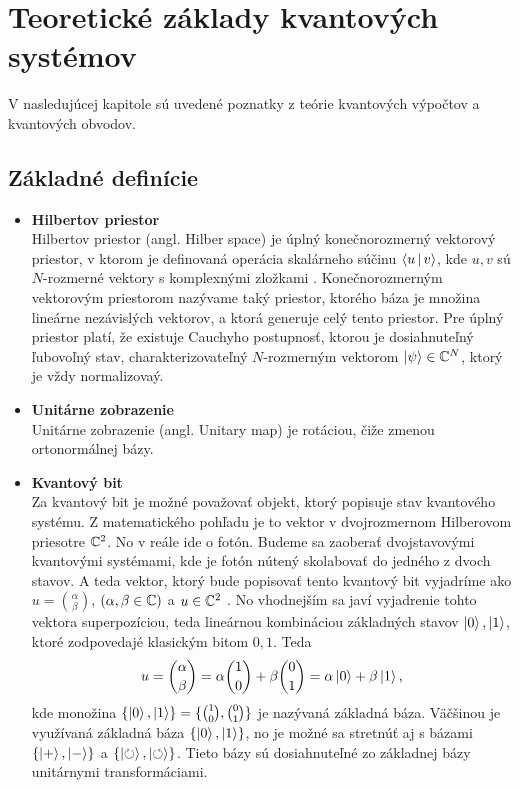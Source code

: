 
\chapter{Teoretické základy kvantových systémov}

V nasledujúcej kapitole sú uvedené poznatky z teórie kvantových výpočtov a kvantových obvodov.

\section{Základné definície}

\begin{itemize}
\item[] \textbf{Hilbertov priestor} \\
\label{hil_space}
Hilbertov priestor (angl. Hilber space) je úplný konečnorozmerný vektorový priestor, v ktorom je definovaná operácia skalárneho súčinu \(\Braket{u|v}\), kde \(u,v\) sú \(N\)-rozmerné vektory s komplexnými zložkami \cite{Nie10}.
Konečnorozmerným vektorovým priestorom nazývame taký priestor, ktorého báza je množina lineárne nezávislých  vektorov, a ktorá generuje celý tento priestor.
Pre úplný priestor platí, že existuje Cauchyho postupnosť, ktorou je dosiahnuteľný ľubovoľný stav, charakterizovateľný \(N\)-rozmerným vektorom \(\Ket{\psi} \in \mathbb{C}^{N}\), ktorý je vždy normalizovaý.

\item[] \textbf{Unitárne zobrazenie} \\
Unitárne zobrazenie (angl. Unitary map) je rotáciou, čiže zmenou ortonormálnej bázy.

\item[] \textbf{Kvantový bit} \\
Za kvantový bit je možné považovať objekt, ktorý popisuje stav kvantového systému.
Z matematického pohľadu je to vektor v dvojrozmernom Hilberovom priesotre \(\mathbb{C}^{2}\).
No v reále ide o fotón.
Budeme sa zaoberať dvojstavovými kvantovými systémami, kde je fotón nútený skolabovať do jedného z dvoch stavov.
A teda vektor, ktorý bude popisovať tento kvantový bit vyjadríme ako \(u = \binom{\alpha}{\beta}\), \( ( \alpha, \beta \in \mathbb{C} ) \) a \(u \in \mathbb{C}^{2}\) \cite{Kay07}.
No vhodnejším sa javí vyjadrenie tohto vektora superpozíciou, teda lineárnou kombináciou základných stavov \(\Ket{0}, \Ket{1}\), ktoré zodpovedajé klasickým bitom \(0,1\).
Teda \[u = \binom{\alpha}{\beta} = \alpha \binom{1}{0} + \beta \binom{0}{1} = \alpha\Ket{0} + \beta\Ket{1},\]
kde monožina \(\{\Ket{0}, \Ket{1}\} = \{\binom{1}{0}, \binom{0}{1}\}\) je nazývaná základná báza.
Väčšinou je využívaná základná báza \(\{\Ket{0}, \Ket{1}\}\), no je možné sa stretnúť aj s bázami \(\{\Ket{+}, \Ket{-}\}\) a \(\{\Ket{\circlearrowright}, \Ket{\circlearrowleft}\}\). Tieto bázy sú dosiahnuteľné zo základnej bázy unitárnymi transformáciami.


\end{itemize}
